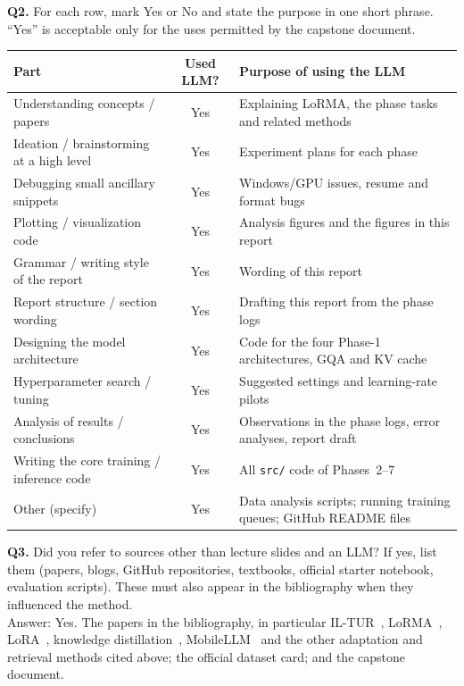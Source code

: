 \documentclass[11pt, oneside]{article}
\begin{document}
\noindent
\textbf{Q2.} For each row, mark Yes or No and state the purpose in one short phrase. ``Yes'' is acceptable only for the uses permitted by the capstone document.
\begin{table}[H]
\centering
\begin{tabular}{>{\raggedright\arraybackslash}p{4.6cm}|c|>{\raggedright\arraybackslash}p{7.2cm}}
\toprule
Part & Used LLM? & Purpose of using the LLM \\
\midrule
Understanding concepts / papers & Yes & Explaining LoRMA, the phase tasks and related methods \\
Ideation / brainstorming at a high level & Yes & Experiment plans for each phase \\
Debugging small ancillary snippets & Yes & Windows/GPU issues, resume and format bugs \\
Plotting / visualization code & Yes & Analysis figures and the figures in this report \\
Grammar / writing style of the report & Yes & Wording of this report \\
Report structure / section wording & Yes & Drafting this report from the phase logs \\
Designing the model architecture & Yes & Code for the four Phase-1 architectures, GQA and KV cache \\
Hyperparameter search / tuning & Yes & Suggested settings and learning-rate pilots \\
Analysis of results / conclusions & Yes & Observations in the phase logs, error analyses, report draft \\
Writing the core training / inference code & Yes & All \texttt{src/} code of Phases~2--7 \\
Other (specify) & Yes & Data analysis scripts; running training queues; GitHub README files \\
\bottomrule
\end{tabular}
\end{table}
\medskip

\noindent
\textbf{Q3.} Did you refer to sources other than lecture slides and an LLM?
If yes, list them (papers, blogs, GitHub repositories, textbooks, official starter notebook, evaluation scripts). These must also appear in the bibliography when they influenced the method. \\[0.4em]
Answer: Yes. The papers in the bibliography, in particular IL-TUR~\cite{joshi2024iltur}, LoRMA~\cite{bihany2025lorma},
LoRA~\cite{hu2022lora}, knowledge distillation~\cite{hinton2015distilling,kim2016seqkd}, MobileLLM~\cite{liu2024mobilellm}
and the other adaptation and retrieval methods cited above; the official dataset card; and the capstone document.
\medskip
\end{document}
